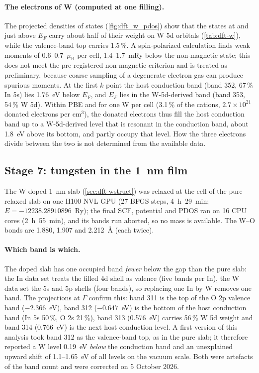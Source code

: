 \paragraph{The electrons of W (computed at one filling).} The projected densities of states (\cref{fig:dft_w_pdos}) show that the
states at and just above $E_F$ carry about half of their weight on W 5d orbitals (\cref{tab:dft-w}), while the
valence-band top carries 1.5\,\%. A spin-polarized calculation finds weak moments of 0.6--0.7~$\mu_{\mathrm{B}}$ per cell,
1.4--1.7~mRy below the non-magnetic state; this does not meet the pre-registered non-magnetic criterion and is treated
as preliminary, because coarse sampling of a degenerate electron gas can produce spurious moments. At the first $k$
point the host conduction band (band 352, 67\,\% In 5s) lies 1.76~eV below $E_F$, and $E_F$ lies in the
W-5d-derived band (band 353, 54\,\% W 5d). Within PBE and for one W per cell (3.1\,\% of the cations,
$2.7\times10^{21}$ donated electrons per cm$^3$), the donated electrons thus fill the host conduction band up to a
W-5d-derived level that is resonant in the conduction band, about 1.8~eV above its bottom, and partly occupy that level.
How the three electrons divide between the two is not determined from the available data.

\subsection{Stage 7: tungsten in the 1~nm film}
\label{sec:dft-calc-iwoslab}

The W-doped 1~nm slab (\cref{sec:dft-wstruct}) was relaxed at the cell of the pure relaxed slab on one H100 NVL GPU
(27 BFGS steps, 4~h~29~min; $E = -12238.28910896$~Ry); the final SCF, potential and PDOS ran on 16 CPU cores
(2~h~55~min), and its bands run aborted, so no mass is available. The W--O bonds are 1.880, 1.907 and 2.212~\AA{}
(each twice).

\paragraph{Which band is which.} The doped slab has one occupied band \emph{fewer} below the gap than the pure slab:
the In data set treats the filled 4d shell as valence (five bands per In), the W data set the 5s and 5p shells (four
bands), so replacing one In by W removes one band. The projections at $\Gamma$ confirm this: band 311 is the top of
the O 2p valence band ($-2.366$~eV), band 312 ($-0.647$~eV) is the bottom of the host conduction band (In 5s 50\,\%,
O 2s 21\,\%), band 313 (0.576~eV) carries 56\,\% W 5d weight and band 314 (0.766~eV) is the next host conduction
level. A first version of this analysis took band 312 as the valence-band top, as in the pure slab; it therefore
reported a W level 0.19~eV \emph{below} the conduction band and an unexplained upward shift of 1.1--1.65~eV of all
levels on the vacuum scale. Both were artefacts of the band count and were corrected on 5 October 2026.

